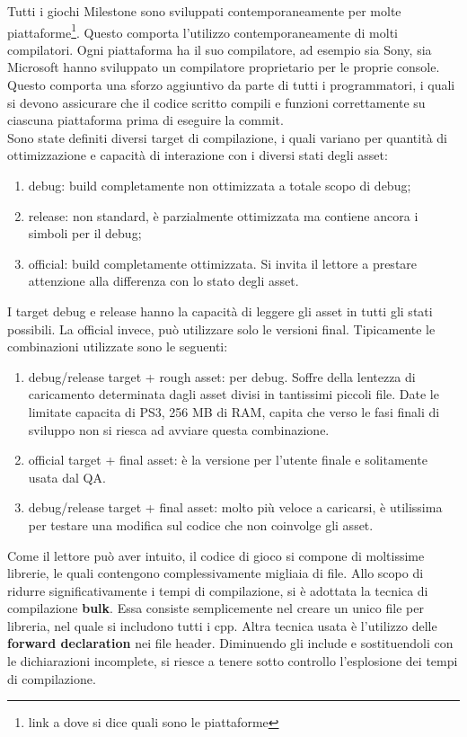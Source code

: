 Tutti i giochi Milestone sono sviluppati contemporaneamente per molte piattaforme\footnote{link a dove si dice quali sono le piattaforme}. Questo comporta l'utilizzo contemporaneamente di molti compilatori. Ogni piattaforma ha il suo compilatore, ad esempio sia Sony, sia Microsoft hanno sviluppato un compilatore proprietario per le proprie console. Questo comporta una sforzo aggiuntivo da parte di tutti i programmatori, i quali si devono assicurare che il codice scritto compili e funzioni correttamente su ciascuna piattaforma prima di eseguire la commit.\\

Sono state definiti diversi target di compilazione, i quali variano per quantità di ottimizzazione e capacità di interazione con i diversi stati degli asset:
\begin{enumerate}
	\item debug: build completamente non ottimizzata a totale scopo di debug;
	\item release: non standard, è parzialmente ottimizzata ma contiene ancora i simboli per il debug;
	\item official: build completamente ottimizzata. Si invita il lettore a prestare attenzione alla differenza con lo stato  degli asset.
\end{enumerate}

I target debug e release hanno la capacità di leggere gli asset in tutti gli stati possibili. La official invece, può utilizzare solo le versioni final. Tipicamente le combinazioni utilizzate sono le seguenti:
\begin{enumerate}
	\item debug/release target + rough asset: per debug. Soffre della lentezza di caricamento determinata dagli asset divisi in tantissimi piccoli file. Date le limitate capacita di PS3\textregistered, 256 MB di RAM, capita che verso le fasi finali di sviluppo non si riesca ad avviare questa combinazione.
	\item official target + final asset: è la versione per l'utente finale e solitamente usata dal QA.
	\item debug/release target + final asset: molto più veloce a caricarsi, è utilissima per testare una modifica sul codice che non coinvolge gli asset.
\end{enumerate}

Come il lettore può aver intuito, il codice di gioco si compone di moltissime librerie, le quali contengono complessivamente migliaia di file. Allo scopo di ridurre significativamente i tempi di compilazione, si è adottata la tecnica di compilazione \textbf{bulk}. Essa consiste semplicemente nel creare un unico file per libreria, nel quale si includono tutti i cpp. Altra tecnica usata è l'utilizzo delle \textbf{forward declaration} nei file header. Diminuendo gli include e sostituendoli con le dichiarazioni incomplete, si riesce a tenere sotto controllo l'esplosione dei tempi di compilazione.\\

